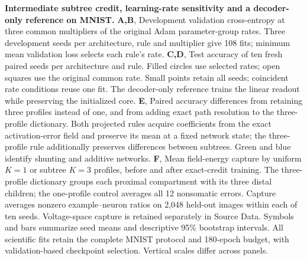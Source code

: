 \caption{\textbf{Intermediate subtree credit, learning-rate sensitivity and a decoder-only reference on MNIST.} \textbf{A,B}, Development validation cross-entropy at three common multipliers of the original Adam parameter-group rates. Three development seeds per architecture, rule and multiplier give 108 fits; minimum mean validation loss selects each rule's rate. \textbf{C,D}, Test accuracy of ten fresh paired seeds per architecture and rule. Filled circles use selected rates; open squares use the original common rate. Small points retain all seeds; coincident rate conditions reuse one fit. The decoder-only reference trains the linear readout while preserving the initialized core. \textbf{E}, Paired accuracy differences from retaining three profiles instead of one, and from adding exact path resolution to the three-profile dictionary. Both projected rules acquire coefficients from the exact activation-error field and preserve its mean at a fixed network state; the three-profile rule additionally preserves differences between subtrees. Green and blue identify shunting and additive networks. \textbf{F}, Mean field-energy capture by uniform $K=1$ or subtree $K=3$ profiles, before and after exact-credit training. The three-profile dictionary groups each proximal compartment with its three distal children; the one-profile control averages all 12 nonsomatic errors. Capture averages nonzero example--neuron ratios on 2,048 held-out images within each of ten seeds. Voltage-space capture is retained separately in Source Data. Symbols and bars summarize seed means and descriptive 95\% bootstrap intervals. All scientific fits retain the complete MNIST protocol and 180-epoch budget, with validation-based checkpoint selection. Vertical scales differ across panels.}
